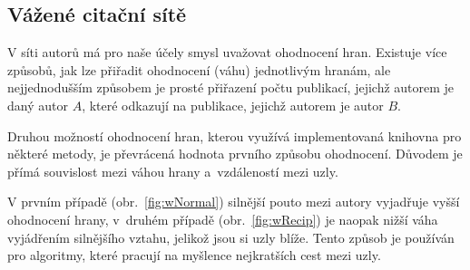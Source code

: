 \documentclass{bakalarka}
\begin{document}
\subsection{Vážené citační sítě}
V síti autorů má pro naše účely smysl uvažovat ohodnocení hran. Existuje více
způsobů, jak lze přiřadit ohodnocení (váhu) jednotlivým hranám, ale
nejjednodušším způsobem je prosté přiřazení počtu publikací, jejichž autorem je
daný autor $A$, které odkazují na publikace, jejichž autorem je autor $B$.

Druhou možností ohodnocení hran, kterou využívá implementovaná knihovna pro
některé metody, je převrácená hodnota prvního způsobu ohodnocení. Důvodem je
přímá souvislost mezi váhou hrany a~vzdáleností mezi uzly. 

V prvním případě (obr.~\ref{fig:wNormal}) silnější pouto mezi autory vyjadřuje
vyšší ohodnocení hrany, v~druhém případě (obr.~\ref{fig:wRecip}) je naopak
nižší váha vyjádřením silnějšího vztahu, jelikož jsou si uzly blíže.  Tento
způsob je používán pro algoritmy, které pracují na myšlence nejkratších cest
mezi uzly. 
\end{document}
